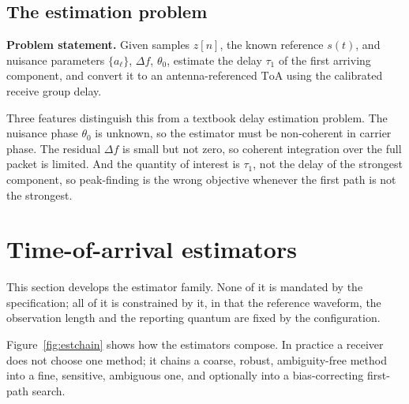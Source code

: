 \documentclass[11pt,a4paper]{article}
\newcommand{\ToA}{\mathrm{ToA}}
\begin{document}
\subsection{The estimation problem}

\begin{callout}
\textbf{Problem statement.} Given samples $z[n]$, the known reference $s(t)$, and nuisance
parameters $\{a_\ell\}$, $\Delta f$, $\theta_0$, estimate the delay $\tau_1$ of the first arriving
component, and convert it to an antenna-referenced $\ToA$ using the calibrated receive group delay.
\end{callout}

Three features distinguish this from a textbook delay estimation problem. The nuisance phase
$\theta_0$ is unknown, so the estimator must be non-coherent in carrier phase. The residual
$\Delta f$ is small but not zero, so coherent integration over the full packet is limited. And the
quantity of interest is $\tau_1$, not the delay of the strongest component, so peak-finding is the
wrong objective whenever the first path is not the strongest.

\section{Time-of-arrival estimators}
\label{sec:estimators}

This section develops the estimator family. None of it is mandated by the specification; all of it
is constrained by it, in that the reference waveform, the observation length and the reporting
quantum are fixed by the configuration.

Figure~\ref{fig:estchain} shows how the estimators compose. In practice a receiver does not choose
one method; it chains a coarse, robust, ambiguity-free method into a fine, sensitive, ambiguous
one, and optionally into a bias-correcting first-path search.
\end{document}
